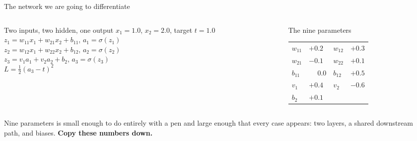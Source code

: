 \documentclass[aspectratio=169]{beamer}
\begin{document}
\begin{frame}[shrink=6]{The network we are going to differentiate}
  \begin{columns}[T]
    \begin{column}{0.48\textwidth}
      \begin{block}{Two inputs, two hidden, one output}
        \small
        $x_1 = 1.0$, \; $x_2 = 2.0$, \; target $t = 1.0$\\[0.4em]
        $z_1 = w_{11}x_1 + w_{21}x_2 + b_{11}$, \; $a_1 = \sigma(z_1)$\\
        $z_2 = w_{12}x_1 + w_{22}x_2 + b_{12}$, \; $a_2 = \sigma(z_2)$\\
        $z_3 = v_1a_1 + v_2a_2 + b_2$, \; $a_3 = \sigma(z_3)$\\[0.4em]
        $L = \tfrac{1}{2}(a_3 - t)^2$
      \end{block}
    \end{column}
    \begin{column}{0.48\textwidth}
      \begin{exampleblock}{The nine parameters}
        \small
        \begin{tabular}{llll}
          \toprule
          $w_{11}$ & $+0.2$ & $w_{12}$ & $+0.3$\\
          $w_{21}$ & $-0.1$ & $w_{22}$ & $+0.1$\\
          $b_{11}$ & $\phantom{+}0.0$ & $b_{12}$ & $+0.5$\\
          $v_1$ & $+0.4$ & $v_2$ & $-0.6$\\
          $b_2$ & $+0.1$ & &\\
          \bottomrule
        \end{tabular}
      \end{exampleblock}
    \end{column}
  \end{columns}
  \vspace{0.2em}
  \begin{center}\small
    Nine parameters is small enough to do entirely with a pen and large
    enough that every case appears: two layers, a shared downstream path, and
    biases. \textbf{Copy these numbers down.}
  \end{center}
\end{frame}
\end{document}
